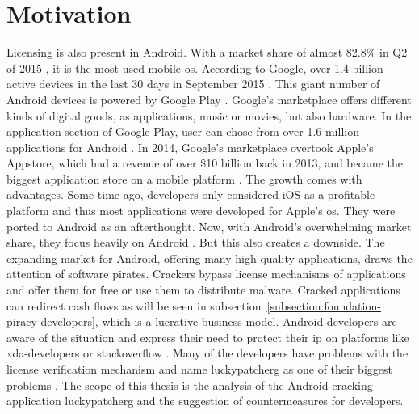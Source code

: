 \section{Motivation} \label{subsection:introduction-motivation}
Licensing is also present in Android.
With a market share of almost 82.8\% in Q2 of 2015 \cite{androidShare}, it is the most used mobile \gls{os}.
According to Google, over 1.4 billion active devices in the last 30 days in September 2015 \cite{androidDevices}.
This giant number of Android devices is powered by Google Play \cite{googlePlay}.
Google's marketplace offers different kinds of digital goods, as applications, music or movies, but also hardware.
In the application section of Google Play, user can chose from over 1.6 million applications for Android \cite{statistaAppStore}.
In 2014, Google's marketplace overtook Apple's Appstore, which had a revenue of over \$10 billion back in 2013, and became the biggest application store on a mobile platform \cite{wiwoValue}.
\newpage
The growth comes with advantages.
Some time ago, developers only considered iOS as a profitable platform and thus most applications were developed for Apple's \gls{os}.
They were ported to Android as an afterthought.
Now, with Android's overwhelming market share, they focus heavily on Android \cite{businessProfit}.
But this also creates a downside.
The expanding market for Android, offering many high quality applications, draws the attention of software pirates.
Crackers bypass license mechanisms of applications and offer them for free or use them to distribute malware.
Cracked applications can redirect cash flows as will be seen in subsection~\ref{subsection:foundation-piracy-developers}, which is a lucrative business model.
\newline
Android developers are aware of the situation \cite{developersPiracy} and express their need to protect their \gls{ip} on platforms like xda-developers \cite{xdaPiracy} or stackoverflow \cite{stackoverflowPiracy}.
Many of the developers have problems with the license verification mechanism and name \gls{luckypatcherg} as one of their biggest problems \cite{stackoverflowLucky}.
\newline
\newline
The scope of this thesis is the analysis of the Android cracking application \gls{luckypatcherg} and the suggestion of countermeasures for developers.
